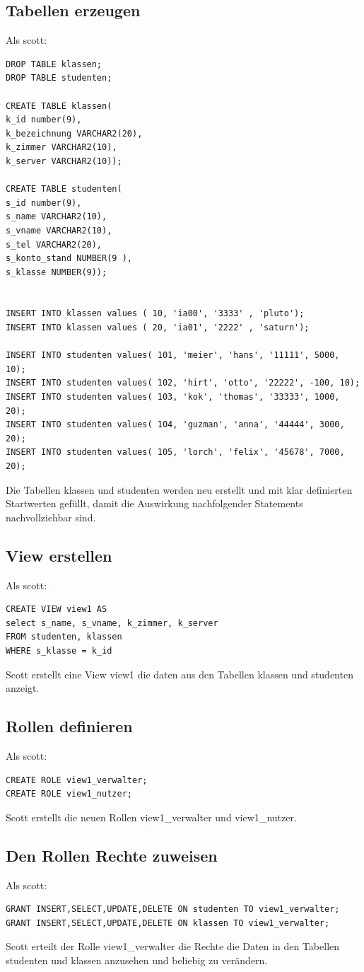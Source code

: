 \documentclass[10pt]{scrreprt}
\begin{document}
\subsection{Tabellen erzeugen}
Als scott:
\begin{lstlisting}[style=sql]
DROP TABLE klassen;
DROP TABLE studenten;

CREATE TABLE klassen(
k_id number(9),
k_bezeichnung VARCHAR2(20),
k_zimmer VARCHAR2(10),
k_server VARCHAR2(10));

CREATE TABLE studenten(
s_id number(9),
s_name VARCHAR2(10),
s_vname VARCHAR2(10),
s_tel VARCHAR2(20),
s_konto_stand NUMBER(9 ),
s_klasse NUMBER(9));


INSERT INTO klassen values ( 10, 'ia00', '3333' , 'pluto');
INSERT INTO klassen values ( 20, 'ia01', '2222' , 'saturn');

INSERT INTO studenten values( 101, 'meier', 'hans', '11111', 5000, 10);
INSERT INTO studenten values( 102, 'hirt', 'otto', '22222', -100, 10);
INSERT INTO studenten values( 103, 'kok', 'thomas', '33333', 1000, 20);
INSERT INTO studenten values( 104, 'guzman', 'anna', '44444', 3000, 20);
INSERT INTO studenten values( 105, 'lorch', 'felix', '45678', 7000, 20);
\end{lstlisting}
Die Tabellen klassen und studenten werden neu erstellt und mit klar definierten Startwerten gefüllt, damit die Auswirkung nachfolgender Statements nachvollziehbar sind.
\subsection{View erstellen}
Als scott:
\begin{lstlisting}[style=sql]
CREATE VIEW view1 AS
select s_name, s_vname, k_zimmer, k_server
FROM studenten, klassen
WHERE s_klasse = k_id
\end{lstlisting}
Scott erstellt eine View view1 die daten aus den Tabellen klassen und studenten anzeigt.

\subsection{Rollen definieren}
Als scott:
\begin{lstlisting}[style=sql]
CREATE ROLE view1_verwalter;
CREATE ROLE view1_nutzer;
\end{lstlisting}
Scott erstellt die neuen Rollen view1\_verwalter und view1\_nutzer. 

\subsection{Den Rollen Rechte zuweisen}
Als scott:
\begin{lstlisting}[style=sql]
GRANT INSERT,SELECT,UPDATE,DELETE ON studenten TO view1_verwalter;
GRANT INSERT,SELECT,UPDATE,DELETE ON klassen TO view1_verwalter;
\end{lstlisting}
Scott erteilt der Rolle view1\_verwalter die Rechte die Daten in den Tabellen studenten und klassen anzusehen und beliebig zu verändern.
\end{document}
